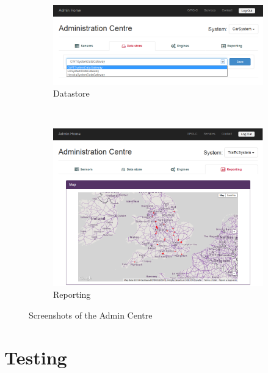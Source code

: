 \documentclass[10pt,a4paper]{article}
\begin{document}
\begin{figure}[h!b]
    \begin{subfigure}{0.49\textwidth}
        \includegraphics[width=\textwidth]{images/admin-centre_data.png}
        \caption{Datastore}
        \label{fig:admin-centre_data}
    \end{subfigure}
	~
	\begin{subfigure}{0.49\textwidth}
        \includegraphics[width=\textwidth]{images/admin-centre_report.png}
        \caption{Reporting}
        \label{fig:admin-centre_report}
    \end{subfigure}
    \caption{Screenshots of the Admin Centre}
	\label{fig:admin-centre}
\end{figure}

\section{Testing}
\label{sec:testing}
\end{document}
